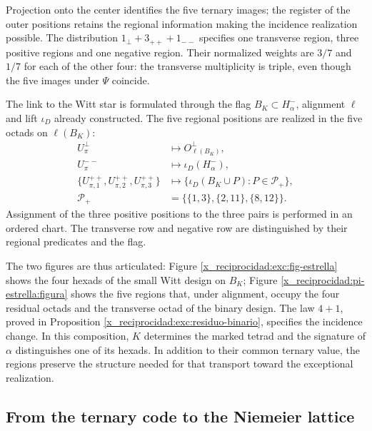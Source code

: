 

Projection onto the center identifies the five ternary images; the
register of the outer positions retains the regional information
making the incidence realization possible. The distribution
\(1_\perp+3_{++}+1_{--}\) specifies one transverse region, three
positive regions and one negative region. Their normalized weights are
\(3/7\) and \(1/7\) for each of the other four: the
transverse multiplicity is triple, even though the five images under
\(\Psi\) coincide.

The link to the Witt star is formulated through the flag
\(B_K\subset H^-_\alpha\), alignment \(\ell\) and
lift \(\iota_D\) already constructed. The five regional positions
are realized in the five octads on \(\ell(B_K)\):
\[
\begin{aligned}
 U_\pi^\perp&\longmapsto O^\perp_{\ell(B_K)},\\
 U_\pi^{--}&\longmapsto\iota_D(H^-_\alpha),\\
 \{U_{\pi,1}^{++},U_{\pi,2}^{++},U_{\pi,3}^{++}\}
 &\longmapsto
 \{\iota_D(B_K\cup P):P\in\mathcal P_+\},\\
 \mathcal P_+&=\bigl\{\{1,3\},\{2,11\},\{8,12\}\bigr\}.
\end{aligned}
\]
Assignment of the three positive positions to the three pairs is
performed in an ordered chart. The transverse row and negative row
are distinguished by their regional predicates and the flag.

The two figures are thus articulated: Figure
\ref{x_reciprocidad:exc:fig-estrella} shows the four hexads of the small Witt
design on \(B_K\); Figure \ref{x_reciprocidad:pi-estrella:figura} shows
the five regions that, under alignment, occupy the four residual
octads and the transverse octad of the binary design. The law
\(4+1\), proved in Proposition
\ref{x_reciprocidad:exc:residuo-binario}, specifies the incidence change. In this
composition, \(K\) determines the marked tetrad and the signature of
\(\alpha\) distinguishes one of its hexads. In addition to
their common ternary value, the regions preserve the structure needed for that
transport toward the exceptional realization.



\subsection{From the ternary code to the Niemeier lattice}
\label{x_reciprocidad:exc:niemeier}

